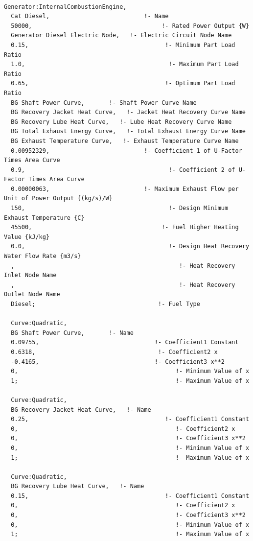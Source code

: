 \begin{lstlisting}

Generator:InternalCombustionEngine,
  Cat Diesel,                           !- Name
  50000,                                     !- Rated Power Output {W}
  Generator Diesel Electric Node,   !- Electric Circuit Node Name
  0.15,                                       !- Minimum Part Load Ratio
  1.0,                                         !- Maximum Part Load Ratio
  0.65,                                       !- Optimum Part Load Ratio
  BG Shaft Power Curve,       !- Shaft Power Curve Name
  BG Recovery Jacket Heat Curve,   !- Jacket Heat Recovery Curve Name
  BG Recovery Lube Heat Curve,   !- Lube Heat Recovery Curve Name
  BG Total Exhaust Energy Curve,   !- Total Exhaust Energy Curve Name
  BG Exhaust Temperature Curve,   !- Exhaust Temperature Curve Name
  0.00952329,                           !- Coefficient 1 of U-Factor Times Area Curve
  0.9,                                         !- Coefficient 2 of U-Factor Times Area Curve
  0.00000063,                           !- Maximum Exhaust Flow per Unit of Power Output {(kg/s)/W}
  150,                                         !- Design Minimum Exhaust Temperature {C}
  45500,                                     !- Fuel Higher Heating Value {kJ/kg}
  0.0,                                         !- Design Heat Recovery Water Flow Rate {m3/s}
  ,                                               !- Heat Recovery Inlet Node Name
  ,                                               !- Heat Recovery Outlet Node Name
  Diesel;                                   !- Fuel Type

  Curve:Quadratic,
  BG Shaft Power Curve,       !- Name
  0.09755,                                 !- Coefficient1 Constant
  0.6318,                                   !- Coefficient2 x
  -0.4165,                                 !- Coefficient3 x**2
  0,                                             !- Minimum Value of x
  1;                                             !- Maximum Value of x

  Curve:Quadratic,
  BG Recovery Jacket Heat Curve,   !- Name
  0.25,                                       !- Coefficient1 Constant
  0,                                             !- Coefficient2 x
  0,                                             !- Coefficient3 x**2
  0,                                             !- Minimum Value of x
  1;                                             !- Maximum Value of x

  Curve:Quadratic,
  BG Recovery Lube Heat Curve,   !- Name
  0.15,                                       !- Coefficient1 Constant
  0,                                             !- Coefficient2 x
  0,                                             !- Coefficient3 x**2
  0,                                             !- Minimum Value of x
  1;                                             !- Maximum Value of x


\end{lstlisting}

